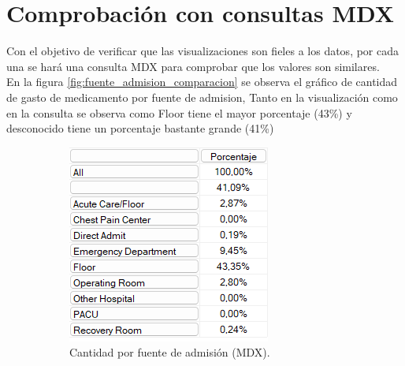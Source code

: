 \documentclass{article}
\begin{document}
\section{Comprobación con consultas MDX}

Con el objetivo de verificar que las visualizaciones son fieles a los datos, por cada una se hará una consulta MDX para comprobar que los valores son similares.\\

En la figura \ref{fig:fuente_admision_comparacion} se observa el gráfico de cantidad de gasto de medicamento por fuente de admision, Tanto en la visualización como en la consulta se observa como Floor tiene el mayor porcentaje (43\%) y desconocido tiene un porcentaje bastante grande (41\%)
\begin{figure}[H]
	\centering
	\begin{subfigure}[b]{0.4\textwidth}
		\centering
		\includegraphics[width=\textwidth]{images/cantidad_fuente_admision_mdx.png}
		\caption{Cantidad por fuente de admisión (MDX).}
		\label{fig:fuente_admision_mdx}
	\end{subfigure}
	\hfill
	\begin{subfigure}[b]{0.4\textwidth}
		\centering

\end{subfigure}
\end{figure}
\end{document}
